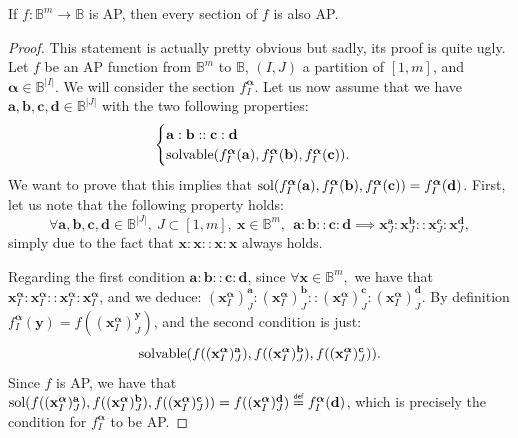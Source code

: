 \begin{property}\label{section_preserve_wap}
If $f\colon \mathbb{B}^m\to \mathbb{B}$ is AP, then every section of $f$ is
  also AP.
\end{property}
\begin{proof}
  This statement is actually pretty obvious but sadly, its proof is quite ugly.
  Let $f$ be an AP function from $\mathbb{B}^m$ to $\mathbb{B}$, $(I,J)$ a
  partition of $[1, m]$, and $\boldsymbol{\alpha} \in \mathbb{B}^{|I|}$. We
  will consider the section  $f^{\boldsymbol{\alpha}}_I$.  Let us now assume
  that we have $\mathbf{a},\mathbf{b},\mathbf{c}, \mathbf{d} \in
  \mathbb{B}^{|J|}$ with the two following properties:
  $$
  \begin{cases}
    \mathbf{a}:\mathbf{b}::\mathbf{c}:\mathbf{d}\\
    \text{solvable}(f^{\boldsymbol{\alpha}}_I(\mathbf{a}),
    f^{\boldsymbol{\alpha}}_I(\mathbf{b}),
    f^{\boldsymbol{\alpha}}_I(\mathbf{c})).
  \end{cases}
  $$
  We want to prove that this implies that
  $\text{sol}(f^{\boldsymbol{\alpha}}_I(\mathbf{a}),
  f^{\boldsymbol{\alpha}}_I(\mathbf{b}), 
  f^{\boldsymbol{\alpha}}_I(\mathbf{c}))
  =
  f^{\boldsymbol{\alpha}}_I(\mathbf{d})$.
  First, let us note that the following property holds:
$$\forall \mathbf{a},\mathbf{b},\mathbf{c}, \mathbf{d} \in \mathbb{B}^{|J|},~J
  \subset [1,m], ~ \mathbf{x} \in \mathbb{B}^m,~~ \mathbf{a}: \mathbf{b} ::
  \mathbf{c} : \mathbf{d} \implies \mathbf{x}^{\mathbf{a}}_J :
  \mathbf{x}^{\mathbf{b}}_J:: \mathbf{x}^{\mathbf{c}}_J :
  \mathbf{x}^{\mathbf{d}}_J,$$
  simply due to the fact that $\mathbf{x}:\mathbf{x}::\mathbf{x}:\mathbf{x}$
  always holds.

Regarding the first condition $\mathbf{a}:\mathbf{b}::\mathbf{c}:\mathbf{d}$,
since $\forall \mathbf{x} \in \mathbb{B}^m,$ we have that $
  \mathbf{x}^{\boldsymbol{\alpha}}_I : \mathbf{x}^{\boldsymbol{\alpha}}_I ::
  \mathbf{x}^{\boldsymbol{\alpha}}_I : \mathbf{x}^{\boldsymbol{\alpha}}_I$,
  and we
  deduce: $(\mathbf{x}^{\boldsymbol{\alpha}}_I)^{\mathbf{a}}_J :
  (\mathbf{x}^{\boldsymbol{\alpha}}_I)^{\mathbf{b}}_J ::
  (\mathbf{x}^{\boldsymbol{\alpha}}_I)^{\mathbf{c}}_J :
  (\mathbf{x}^{\boldsymbol{\alpha}}_I)^{\mathbf{d}}_J$.
By definition $f^{\boldsymbol{\boldsymbol{\alpha}}}_I(\mathbf{y}) =
  f((\mathbf{x}^{\boldsymbol{\alpha}}_I)^{\mathbf{y}}_J)$, and the second
  condition is just:
  $$\text{solvable}(f((\mathbf{x}^{\boldsymbol{\alpha}}_I)^\mathbf{a}_J),
  f((\mathbf{x}^{\boldsymbol{\alpha}}_I)^\mathbf{b}_J),
  f((\mathbf{x}^{\boldsymbol{\alpha}}_I)^\mathbf{c}_J)).$$
  Since $f$ is AP, we have that
  $\sol(f((\mathbf{x}^{\boldsymbol{\alpha}}_I)^\mathbf{a}_J),
  f((\mathbf{x}^{\boldsymbol{\alpha}}_I)^\mathbf{b}_J),
  f((\mathbf{x}^{\boldsymbol{\alpha}}_I)^\mathbf{c}_J))=
  f((\mathbf{x}^{\boldsymbol{\alpha}}_I)^\mathbf{d}_J) \eqdef
  f^{\boldsymbol{\alpha}}_I(\mathbf{d})$,
  which is precisely the condition for
  $f^{\boldsymbol{\boldsymbol{\alpha}}}_I$ to be AP.
\end{proof}


